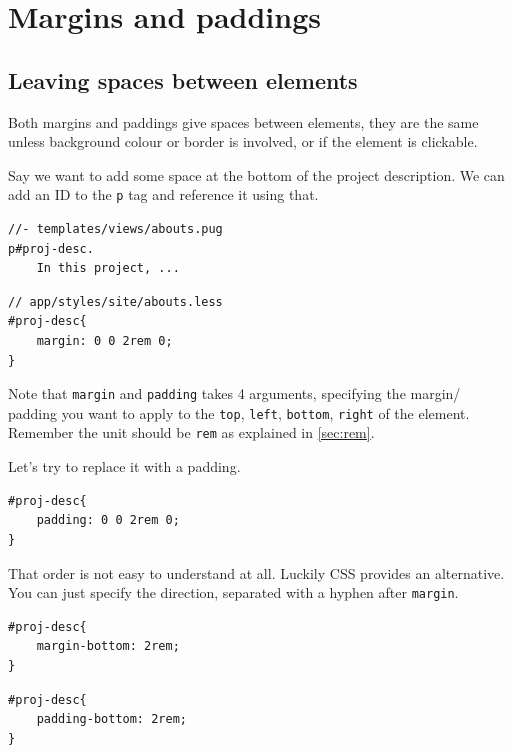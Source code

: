 \section{Margins and paddings}
\label{sec:marginpadding}
\label{sec:margin}

\subsection*{Leaving spaces between elements}

Both margins and paddings give spaces between elements, they are the same unless background colour or border is involved, or if the element is clickable.

Say we want to add some space at the bottom of the project description. We can add an ID to the \texttt{p} tag and reference it using that.

\begin{lstlisting}[language=pug]
//- templates/views/abouts.pug
p#proj-desc.
    In this project, ...
\end{lstlisting}

\begin{lstlisting}[language=pug]
// app/styles/site/abouts.less
#proj-desc{
    margin: 0 0 2rem 0;
}
\end{lstlisting}

Note that \texttt{margin} and \texttt{padding} takes 4 arguments, specifying the margin/ padding you want to apply to the \texttt{top}, \texttt{left}, \texttt{bottom}, \texttt{right} of the element. Remember the unit should be \texttt{rem} as explained in \cref{sec:rem}.

Let's try to replace it with a padding.

\begin{lstlisting}[language=pug]
#proj-desc{
    padding: 0 0 2rem 0;
}
\end{lstlisting}

That order is not easy to understand at all. Luckily CSS provides an alternative. You can just specify the direction, separated with a hyphen after \texttt{margin}.

\begin{lstlisting}[language=pug]
#proj-desc{
    margin-bottom: 2rem;
}
\end{lstlisting}

\begin{lstlisting}[language=pug]
#proj-desc{
    padding-bottom: 2rem;
}
\end{lstlisting}

